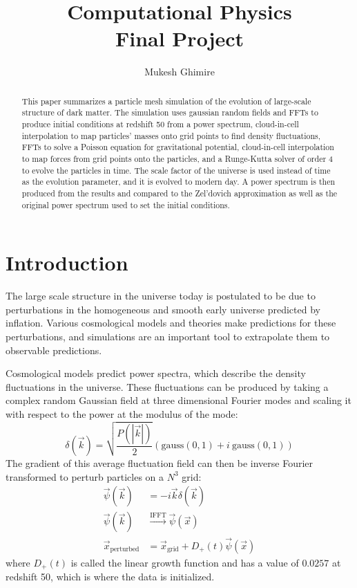 \documentclass[12pt]{article}   	%
\title{Computational Physics\\Final Project}
\author{Mukesh Ghimire}
\date{}							%
\begin{document}
\maketitle
\begin{abstract}
	This paper summarizes a particle mesh simulation of the evolution of large-scale structure of dark 
	matter. The simulation uses gaussian random fields and FFTs to produce initial conditions at 
	redshift 50 from a power spectrum, cloud-in-cell interpolation to map particles' masses onto grid 
	points to find density fluctuations, FFTs to solve a Poisson equation for gravitational potential, 
	cloud-in-cell interpolation to map forces from grid points onto the particles, and a Runge-Kutta 
	solver of order 4 to evolve the particles in time. The scale factor of the universe is used instead of 
	time as the evolution parameter, and it is evolved to modern day. A power spectrum is then 
	produced from the results and compared to the Zel'dovich approximation as well as the original 
	power spectrum used to set the initial conditions.
\end{abstract}

\section*{Introduction}
The large scale structure in the universe today is postulated to be due to perturbations in the 
homogeneous and smooth early universe predicted by inflation. Various cosmological models and
theories make predictions for these perturbations, and simulations are an important tool to extrapolate
them to observable predictions.

Cosmological models predict power spectra, which describe the density fluctuations in the universe.
These fluctuations can be produced by taking a complex random Gaussian field at three dimensional
Fourier modes and scaling it with respect to the power at the modulus of the mode:
\begin{equation}
	\delta(\vec k) = \sqrt{\frac{P(|\vec k|)}{2}}(\text{gauss}(0,1) + i\ \text{gauss}(0,1))
\end{equation}
The gradient of this average fluctuation field can then be inverse Fourier transformed to perturb 
particles on a $N^3$ grid:
\begin{align}
	\vec \psi(\vec k) &= -i\vec k \delta(\vec k)\\
	\vec\psi(\vec k) &\overset{\text{IFFT}}{\to}\vec \psi(\vec x) \nonumber \\
	\vec x_{\text{perturbed}} &= \vec x_{\text{grid}} + D_+(t)\vec \psi(\vec x)
\end{align}
where $D_+(t)$ is called the linear growth function and has a value of $0.0257$ at redshift 50, which
is where the data is initialized.
\end{document}
